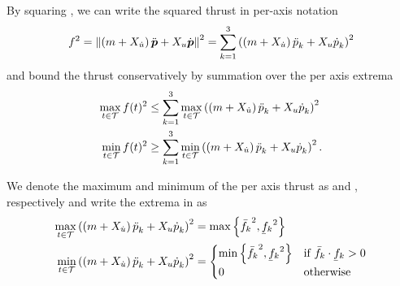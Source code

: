 By squaring , we can write the squared thrust in per-axis notation
\begin{equation}
	\label{eq:thrust-squared-per-axis}
	f^2 = 
	\left\lVert
	\left(m + X_{\dot{u}}\right) \mbox{$\ddot{\bm{p}}$} + X_u \mbox{$\dot{\bm{p}}$}
	\right\rVert^2
	= 
	\sum_{k=1}^{3}
	\left(\left(m + X_{\dot{u}}\right)\mbox{$\ddot{p}$}_k + X_u \mbox{$\dot{p}$}_k \right)^2
\end{equation}
and bound the thrust conservatively by summation over the per axis extrema
\begin{align}
	\label{eq:fmax-per-axis}
	\max_{t \in \mathcal{T}} f(t)^2
	&\leq
	\sum_{k=1}^{3}
	\max_{t \in \mathcal{T}}
	\left(
		\left(m + X_{\dot{u}}\right)
		\mbox{$\ddot{p}$}_k
		+ X_u \mbox{$\dot{p}$}_k
	\right)^2 \\
	\label{eq:fmin-per-axis}
	\min_{t \in \mathcal{T}} f(t)^2
	&\geq
	\sum_{k=1}^{3}
	\min_{t \in \mathcal{T}}
	\left(
		\left(m + X_{\dot{u}}\right)
		\mbox{$\ddot{p}$}_k
		+ X_u \mbox{$\dot{p}$}_k
	\right)^2
	.
\end{align}

We denote the maximum and minimum of the per axis thrust as \fmaxaxis and \fminaxis, respectively  
and write the extrema in  as
\begin{align}
	\max_{t \in \mathcal{T}}
	\left(
		\left(m + X_{\dot{u}}\right)
		\ppp_k
		+ X_u \pp_k
	\right)^2
	&= 
	\max\left\{\fmaxaxis^2, \fminaxis^2\right\} \\
	\min_{t \in \mathcal{T}}
	\left(
		\left(m + X_{\dot{u}}\right)
		\ppp_k
		+ X_u \pp_k
	\right)^2
	&=
	\begin{cases}
		\min\left\{\fmaxaxis^2, \fminaxis^2\right\}
		& \text{if } \fmaxaxis\cdot\fminaxis > 0 \\
		0
		& \text{otherwise}
	\end{cases}
\end{align}

